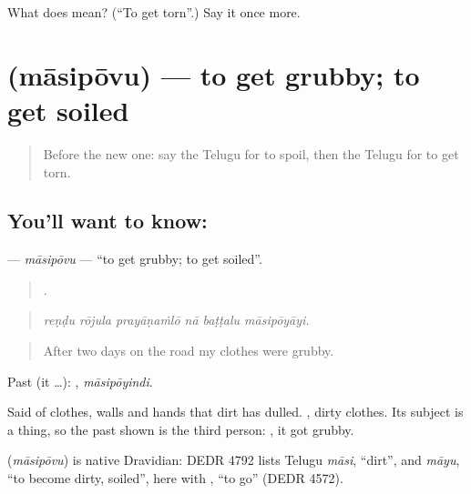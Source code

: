 \begin{tcolorbox}[breakable,colback=teal!4,colframe=teal!35!black,title={Before you move on}]
What does  mean? (\textquotedblleft{}To get torn\textquotedblright{}.) Say it once more.
\end{tcolorbox}
\section[\texorpdfstring{\te{మాసిపోవు} (māsipōvu)}{మాసిపోవు (māsipōvu)}]{ (māsipōvu) — to get grubby; to get soiled}

\label{lesson:TE-C490-masipovu}



\begin{quote}
Before the new one: say the Telugu for to spoil, then the Telugu for to get torn.
\end{quote}

\subsection*{You'll want to know: }
\textbf{} — \emph{māsipōvu} — \textquotedblleft{}to get grubby; to get soiled\textquotedblright{}.

\begin{quote}
     .
\end{quote}

\begin{quote}
\emph{reṇḍu rōjula prayāṇaṁlō nā baṭṭalu māsipōyāyi.}
\end{quote}

\begin{quote}
After two days on the road my clothes were grubby.
\end{quote}

Past (it …): , \emph{māsipōyindi}.

Said of clothes, walls and hands that dirt has dulled.  , dirty clothes. Its subject is a thing, so the past shown is the third person: , it got grubby.

\begin{cousinweb}
\textbf{} (\emph{māsipōvu}) is native Dravidian: DEDR 4792 lists Telugu \emph{māsi}, \textquotedblleft{}dirt\textquotedblright{}, and \emph{māyu}, \textquotedblleft{}to become dirty, soiled\textquotedblright{}, here with , \textquotedblleft{}to go\textquotedblright{} (DEDR 4572).
\end{cousinweb}

